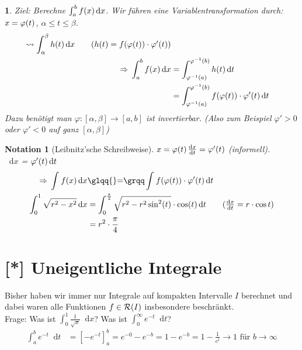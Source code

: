 \documentclass[11pt, twoside, a4paper]{article}
\theoremstyle{plain}
\newtheorem{notation}[blockelement]{Notation}
\newtheorem{genv}[blockelement]{}
\numberwithin{equation}{subsection}
\newcommand{\of}[1]{\mathopen{}\mathclose{}\bgroup\left(#1\aftergroup\egroup\right)}
\newcommand{\interv}[1]{\left[#1\right]}
\newcommand{\impl}[0]{\Rightarrow{}}
\newcommand{\fromto}{\rightarrow{}}
\newcommand{\dif}{\mathop{}\!\mathrm{d}}
\newcommand{\anf}[1]{\glqq{}#1\grqq}
\newcommand{\mR}{\mathcal{R}}
\begin{document}
    \begin{genv}
        \marginnote{[10. Mai]}
        Ziel: Berechne $ \int_{a}^{b} f\of{x} \dif x$. Wir führen eine Variablentransformation durch: $x=\varphi\of{t}$, $\alpha \leq t \leq \beta$.
        \begin{align*}
            \leadsto \int_{\alpha}^{\beta} h\of{t} \dif x\tag{$h\of{t} = f\of{\varphi\of{t}}\cdot\varphi'\of{t}$}\\
            \impl \int_{a}^{b} f\of{x} \dif x &= \int_{\varphi^{-1}\of{a}}^{\varphi^{-1}\of{b}} h\of{t} \dif t\\
            &= \int_{\varphi^{-1}\of{a}}^{\varphi^{-1}\of{b}} f\of{\varphi\of{t}}\cdot\varphi'\of{t} \dif t
        \end{align*}
        Dazu benötigt man $\varphi: \interv{\alpha, \beta}\fromto\interv{a,b}$ ist invertierbar. (Also zum Beispiel $\varphi' > 0$ oder $\varphi' < 0$ auf ganz $\interv{\alpha, \beta}$)
    \end{genv}

    \begin{notation}[Leibnitz'sche Schreibweise]
        $x=\varphi\of{t}$\quad $\frac{\dif x}{\dif t} = \varphi'\of{t}$ (informell).\\
        $\dif x$ \anf{=} $\varphi'\of{t}\dif t$
        \begin{align*}
            \impl \int_{}^{} f\of{x} \dif x &\text{\anf{=}} \int_{}^{} f\of{\varphi\of{t}}\cdot\varphi'\of{t} \dif t\\
            \int_{0}^{1} \sqrt{r^2-x^2} \dif x &= \int_{0}^{\frac{\pi}{2}} \sqrt{r^2-r^2\sin^2\of{t}}\cdot\cos\of{t} \dif t\tag{$\frac{\dif x}{\dif t} = r\cdot\cos t$}\\
            &= r^2\cdot\frac{\pi}{4}
        \end{align*}
    \end{notation}

    \newpage


    \section{[*] Uneigentliche Integrale}
    \thispagestyle{pagenumberonly}
    Bisher haben wir immer nur Integrale auf kompakten Intervalle $I$ berechnet und dabei waren alle Funktionen $f\in\mR\of{I}$ insbesondere beschränkt.\\
    Frage: Was ist $ \int_{0}^{1} \frac{1}{\sqrt{x}} \dif x$? Was ist $ \int_{0}^{\infty} e^{-t} \dif t$?
    \begin{align*}
        \int_{a}^{b} e^{-t} \dif t &= \interv{-e^{-t}}_a^b = e^{-0} - e^{-b} = 1 - e^{-b} = 1 -\frac{1}{e^t}\fromto 1 \text{ für } b\fromto\infty
    \end{align*}
\end{document}
